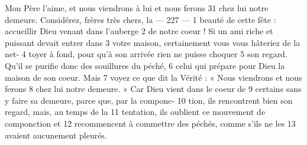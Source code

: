 Mon Père l'aime, et nous viendrons à lui et nous ferons	 
31	 	chez lui notre demeure. Considérez, frères très chers, la	 
 	--- 227 ---	 
1	 	beauté de cette fête : accueillir Dieu venant dans l'auberge	 
2	 	de notre coeur ! Si un ami riche et puissant devait entrer dans	 
3	 	votre maison, certainement vous vous hâteriez de la net-	 
4	 	toyer à fond, pour qu'à son arrivée rien ne puisse choquer	 
5	 	son regard. Qu'il se purifie donc des souillures du péché,	 
6	 	celui qui prépare pour Dieu la maison de son coeur. Mais	 
7	 	voyez ce que dit la Vérité : « Nous viendrons et nous ferons	 
8	 	chez lui notre demeure. » Car Dieu vient dans le coeur de	 
9	 	certains sans y faire sa demeure, parce que, par la componc-	 
10	 	tion, ils rencontrent bien son regard, mais, au temps de la	 
11	 	tentation, ils oublient ce mouvement de componction et	 
12	 	recommencent à commettre des péchés, comme s'ils ne les	 
13	 	avaient aucunement pleurés.